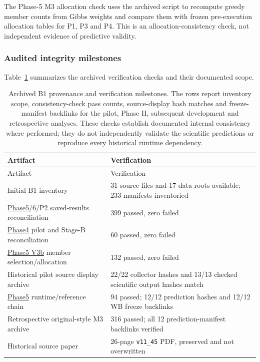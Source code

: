 \documentclass[10pt,a4paper]{article}
\begin{document}
The Phase-5 M3 allocation check uses the archived  script to recompute greedy member counts from Gibbs weights and compare them with frozen pre-execution allocation tables for P1, P3 and P4. This is an allocation-consistency check, not independent evidence of predictive validity.

\subsubsection*{Audited integrity milestones}

Table~\ref{tab:integrity-milestones} summarizes the archived verification checks and their documented scope.

\begingroup
\footnotesize
\setlength{\tabcolsep}{3pt}
\begin{longtable}{@{}p{}p{}@{}}
\caption{Archived B1 provenance and verification milestones. The rows report inventory scope, consistency-check pass counts, source-display hash matches and freeze-manifest backlinks for the pilot, Phase II, subsequent development and retrospective analyses. These checks establish documented internal consistency where performed; they do not independently validate the scientific predictions or reproduce every historical runtime dependency.}\label{tab:integrity-milestones}\\
\toprule
Artifact & Verification \\
\midrule
\endfirsthead
\toprule
Artifact & Verification \\
\midrule
\endhead
Initial B1 inventory & 31 source files and 17 data roots available; 233 manifests inventoried \\
\hyperref[app:experiment-stages]{Phase5}/6/P2 saved-results reconciliation & 399 passed, zero failed \\
\hyperref[app:experiment-stages]{Phase4} pilot and Stage-B reconciliation & 60 passed, zero failed \\
\hyperref[app:experiment-stages]{Phase5 V3b} member selection/allocation & 132 passed, zero failed \\
Historical pilot source display archive & 22/22 collector hashes and 13/13 checked scientific output hashes match \\
\hyperref[app:experiment-stages]{Phase5} runtime/reference chain & 94 passed; 12/12 prediction hashes and 12/12 WB freeze backlinks \\
Retrospective original-style M3 archive & 316 passed; all 12 prediction-manifest backlinks verified \\
Historical source paper & 26-page \texttt{v11\_45} PDF, preserved and not overwritten \\
\bottomrule
\end{longtable}
\endgroup
\end{document}
